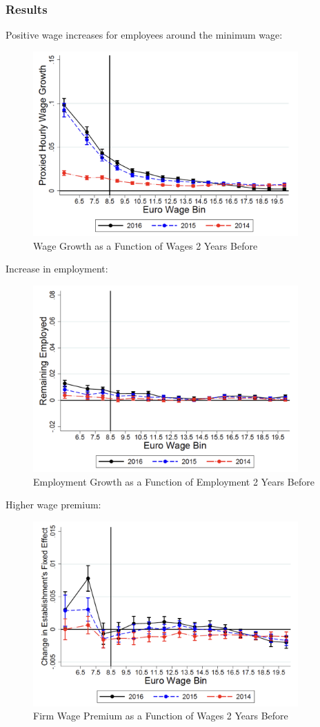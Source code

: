         \subsubsection{Results}
            Positive wage increases for employees around the minimum wage:
            \begin{figure}[H]
                \centering
                \includegraphics[width=4in]{images/ch2/reallocation_1.png}
                \caption{Wage Growth as a Function of Wages 2 Years Before}
            \end{figure}
            Increase in employment:
            \begin{figure}[H]
                \centering
                \includegraphics[width=4in]{images/ch2/reallocation_2.png}
                \caption{Employment Growth as a Function of Employment 2 Years Before}
            \end{figure}
            Higher wage premium:
            \begin{figure}[H]
                \centering
                \includegraphics[width=4in]{images/ch2/reallocation_3.png}
                \caption{Firm Wage Premium as a Function of Wages 2 Years Before}
            \end{figure}
